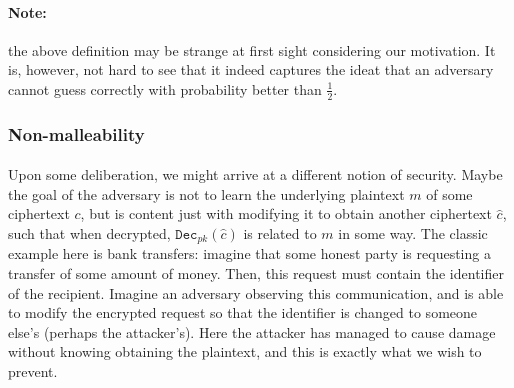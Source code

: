 \documentclass{article}
\theoremstyle{definition}
\theoremstyle{example}
\newcommand{\Dec}{\texttt{Dec}}
\begin{document}
\paragraph{Note:} the above definition may be strange at first sight considering
our motivation. It is, however, not hard to see that it indeed captures the
ideat that an adversary cannot guess correctly with probability better than
$\frac12$. 
\subsubsection{Non-malleability}
\paragraph{} Upon some deliberation, we might arrive at a different notion of
security. Maybe the goal of the adversary is not to learn the underlying
plaintext $m$ of some ciphertext $c$, but is content just with modifying it to
obtain another ciphertext $\hat{c}$, such that when decrypted,
$\Dec_{pk}(\hat{c})$ is related to $m$ in some way. The classic example here is
bank transfers: imagine that some honest party is requesting a transfer of some
amount of money. Then, this request must contain the identifier of the
recipient. Imagine an adversary observing this communication, and is able to
modify the encrypted request so that the identifier is changed to someone else's
(perhaps the attacker's). Here the attacker has managed to cause damage without
knowing obtaining the plaintext, and this is exactly what we wish to prevent.
\end{document}
